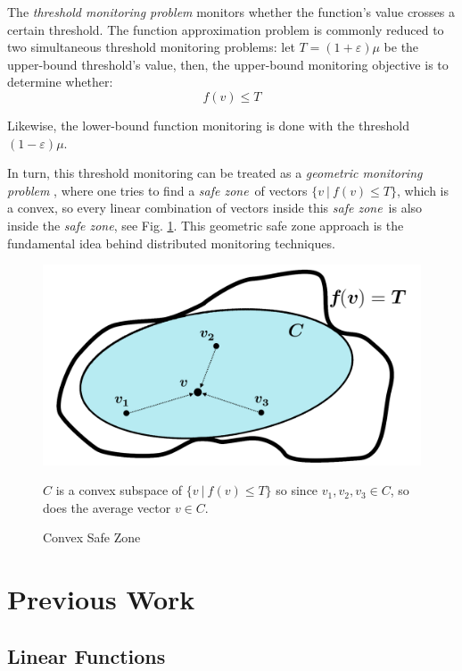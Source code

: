 \documentclass[11pt, conference]{article}
\newcommand{\safeZone}{\textit{safe zone}}
\begin{document}
The \textit{threshold monitoring problem} \cite{garofalakis2013sketch}  monitors whether the function's value crosses a certain threshold. The function approximation problem is commonly reduced to two simultaneous threshold monitoring problems: let ${T = (1+\varepsilon )\mu}$ be the upper-bound threshold's value, then, the upper-bound monitoring objective is to determine whether:
\begin{equation}
f(v) \leq T
\end{equation}

Likewise, the lower-bound function monitoring is done with the threshold ${(1-\varepsilon )\mu}$.

In turn, this threshold monitoring can be treated as a \textit{geometric monitoring problem} \cite{sharfman2007geometric}, where one tries to find a \safeZone \ of vectors ${\{v \ | \ f(v) \leq T\}}$, which is a convex, so every linear combination of vectors inside this \safeZone \ is also inside the \safeZone , see Fig. \ref{fig:ConvexSafeZoneSketch}. This geometric safe zone approach is the fundamental idea behind distributed monitoring techniques.

\begin{figure}[h]
\begin{center}
\includegraphics[width=0.6\linewidth]{Pics/PNGs/ConvexSafeZone.png}
\end{center}
\caption{Convex Safe Zone}
\label{fig:ConvexSafeZoneSketch}
\medskip
\small
\begin{center}
$C$ is a convex subspace of ${\{v \ | \ f(v) \leq T\}}$ so since ${v_1,v_2,v_3 \in C}$, so does the average vector $v \in C$.
\end{center}
\end{figure}

\section{Previous Work}

\subsection{Linear Functions}
\end{document}
